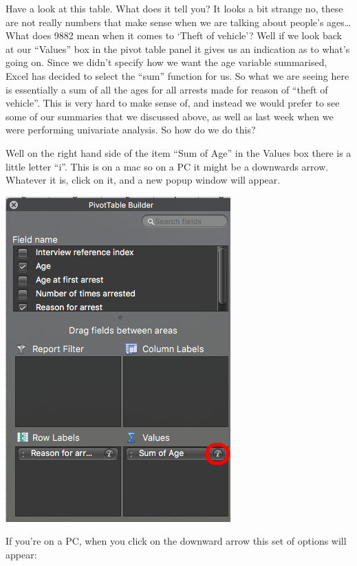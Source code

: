 \documentclass[
]{book}
\begin{document}
Have a look at this table. What does it tell you? It looks a bit strange no, these are not really numbers that make sense when we are talking about people's ages\ldots{} What does 9882 mean when it comes to `Theft of vehicle'? Well if we look back at our ``Values'' box in the pivot table panel it gives us an indication as to what's going on. Since we didn't specify how we want the age variable summarised, Excel has decided to select the ``sum'' function for us. So what we are seeing here is essentially a sum of all the ages for all arrests made for reason of ``theft of vehicle''. This is very hard to make sense of, and instead we would prefer to see some of our summaries that we discussed above, as well as last week when we were performing univariate analysis. So how do we do this?

Well on the right hand side of the item ``Sum of Age'' in the Values box there is a little letter ``i''. This is on a mac so on a PC it might be a downwards arrow. Whatever it is, click on it, and a new popup window will appear.

\includegraphics{imgs/change_from_sum.png}

If you're on a PC, when you click on the downward arrow this set of options will appear:
\end{document}
